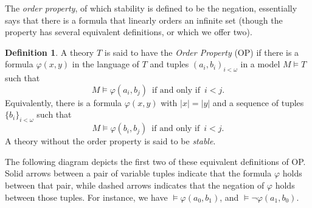 \documentclass{article}
\newcommand{\vphi}{\varphi}
\theoremstyle{definition}
\newtheorem{definition}{Definition}
\theoremstyle{definition}
\theoremstyle{definition}
\begin{document}
The \textit{order property}, of which stability is defined to be the negation, essentially says that there is a formula that linearly orders an infinite set (though the property has several equivalent definitions, or which we offer two).

\begin{definition}
A theory $T$ is said to have the \textit{Order Property}  ($\mathrm{OP}$) if there is a formula $\vphi(x,y)$ in the language of $T$ and tuples $(a_i, b_i)_{i< \omega}$ in a model $M\models T$ such that $$M\models \vphi(a_i,b_j)\enspace\text{if and only if}\enspace i<j.$$ Equivalently, there is a formula $\varphi(x, y)$ with $|x|=|y|$ and a sequence of tuples $\{b_{i}\}_{i <\omega}$ such that $$M\models \vphi(b_i,b_j)\enspace\text{if and only if}\enspace i<j.$$ A theory without the order property is said to be \textit{stable}.


\end{definition}

The following diagram depicts the first two of these equivalent definitions of OP. Solid arrows between a pair of variable tuples indicate that the formula $\vphi$ holds between that pair, while dashed arrows indicates that the negation of $\vphi$ holds between those tuples. For instance, we have $\models\vphi(a_0, b_1)$, and $\models\neg\vphi(a_1,b_0)$.

\end{document}
